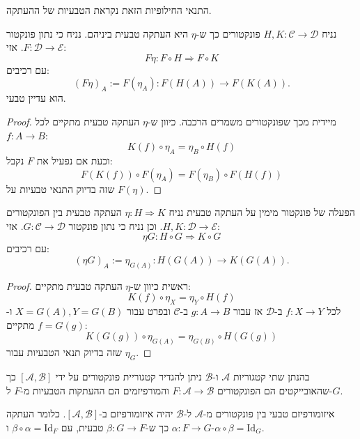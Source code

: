 \documentclass{tstextbook}
\begin{document}
\begin{remark}
התנאי החילופיות הזאת נקראת הטבעיות של ההעתקה.

\end{remark}
\begin{proposition}
נניח \(H,K:\mathcal{C}\to \mathcal{D}\) פונקטורים כך ש-\(\eta\) היא העתקה טבעית ביניהם. נניח כי נתון פונקטור \(F:\mathcal{D}\to \mathcal{E}\). אזי:
$$F\eta:F\circ H\Rightarrow F\circ K$$
עם רכיבים:
$$(F\eta)_{A}:=F(\eta_{A}):F(H(A))\to F(K(A)).$$
הוא עדיין טבעי.

\end{proposition}
\begin{proof}
מיידית מכך שפונקטורים משמרים הרכבה. כיוון ש-\(\eta\) העתקה טבעית מתקיים לכל \(f:A\to B\):
$$K(f)\circ\eta_{A}=\eta_{B}\circ H(f)$$
וכעת אם נפעיל את \(F\) נקבל:
$$F(K(f))\circ F(\eta_{A})=F(\eta_{B})\circ F(H(f))$$
שזה בדיוק התנאי טבעיות על \(F\left( \eta \right)\).

\end{proof}
\begin{proposition}
הפעלה של פונקטור מימין על העתקה טבעית
נניח \(\eta:H\Rightarrow K\) העתקה טבעית בין הפונקטורים \(H,K:\mathcal{D}\to \mathcal{E}\). וכן נניח כי נתון פונקטור \(G:\mathcal{C}\to \mathcal{D}\). אזי:
$$\eta G:H\circ G\Rightarrow K\circ G$$
עם רכיבים:
$$(\eta G)_{A}:=\eta_{G(A)}:H(G(A))\to K(G(A)).$$

\end{proposition}
\begin{proof}
ראשית כיוון ש-\(\eta\) העתקה טבעית מתקיים:
$$K(f)\circ\eta_{X}=\eta_{Y}\circ H(f)$$
לכל \(f:X\to Y\) ב-\(\mathcal{D}\) אז עבור \(g:A\to B\) ב-\(\mathcal{C}\) ובפרט עבור \(X=G(A),Y=G(B)\) ו- \(f=G(g)\) מתקיים:
$$K(G(g))\circ\eta_{G(A)}=\eta_{G(B)}\circ H(G(g))$$
שזה בדיוק תנאי הטבעיות עבור \(\eta_{G}\).

\end{proof}
\begin{definition}
בהנתן שתי קטגוריות \(\mathcal{A}\) ו-\(\mathcal{B}\) ניתן להגדיר קטגוריית פונקטורים על ידי \([\mathcal{A},\mathcal{B}]\) כך שהאובייקטים הם הפונקטורים \(F:\mathcal{A}\to \mathcal{B}\) והמורפיזמים הם ההעתקות הטבעיות מ-\(F\) ל-\(G\).

\end{definition}
\begin{definition}
איזומורפיזם טבעי בין פונקטורים מ-\(\mathcal{A}\) ל-\(\mathcal{B}\) יהיה איזומורפיזם ב-\([\mathcal{A},\mathcal{B}]\). כלומר העתקה \(\alpha:F\to G\) כך ש-\(\beta:G\to F\) טבעית, עם \(\beta \circ \alpha = \mathrm{Id}_{F}\) ו-\(\alpha \circ \beta = \mathrm{Id}_{G}\).

\end{definition}
\end{document}
